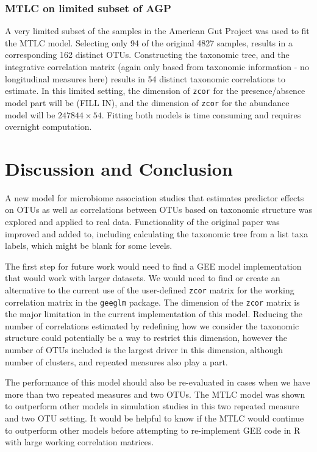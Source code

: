\documentclass[12pt]{article}
\begin{document}
\subsubsection{MTLC on limited subset of AGP}

A very limited subset of the samples in the American Gut Project was used to fit the MTLC model. Selecting only 94 of the original 4827 samples, results in a corresponding 162 distinct OTUs. Constructing the taxonomic tree, and the integrative correlation matrix (again only based from taxonomic information - no longitudinal measures here) results in 54 distinct taxonomic correlations to estimate. In this limited setting, the dimension of \texttt{zcor} for the presence/absence model part will be (FILL IN), and the dimension of \texttt{zcor} for the abundance model will be $247844 \times 54$. Fitting both models is time consuming and requires overnight computation.


\section{Discussion and Conclusion}

A new model for microbiome association studies that estimates predictor effects on OTUs as well as correlations between OTUs based on taxonomic structure was explored and applied to real data. Functionality of the original paper was improved and added to, including calculating the taxonomic tree from a list taxa labels, which might be blank for some levels.

The first step for future work would need to find a GEE model implementation that would work with larger datasets. We would need to find or create an alternative to the current use of the user-defined \texttt{zcor} matrix for the working correlation matrix in the \texttt{geeglm} package. The dimension of the \texttt{zcor} matrix is the major limitation in the current implementation of this model. Reducing the number of correlations estimated by redefining how we consider the taxonomic structure could potentially be a way to restrict this dimension, however the number of OTUs included is the largest driver in this dimension, although number of clusters, and repeated measures also play a part.

The performance of this model should also be re-evaluated in cases when we have more than two repeated measures and two OTUs. The MTLC model was shown to outperform other models in simulation studies in this two repeated measure and two OTU setting. It would be helpful to know if the MTLC would continue to outperform other models before attempting to re-implement GEE code in R with large working correlation matrices.
\end{document}
